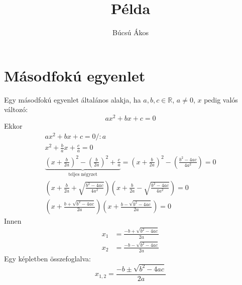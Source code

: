 \documentclass{article}%
\title{Példa}
\author{Búcsú Ákos}
\date{}
\begin{document}
	\maketitle%

	\section{Másodfokú egyenlet}
	Egy másodfokú egyenlet általános alakja, ha $a,b,c\in\mathbb{R}$, $a\neq 0$, $x$ pedig valós változó:
	\begin{equation}
		ax^2+bx+c=0
	\end{equation}
	Ekkor
	\begin{gather}
		ax^2+bx+c=0\Big/:a\\
		x^2+\frac{b}{a}x+\frac{c}{a}=0\\
		\underbrace{\left(x+\frac{b}{2a}\right)^2-
		\left(\frac{b}{2a}\right)^2+\frac{c}{a}}_{\text{teljes négyzet}}=
		\left(x+\frac{b}{2a}\right)^2-
		\left(\frac{b^2-4ac}{4a^2}\right)=0\\
		\left(x+\frac{b}{2a}+\sqrt{\frac{b^2-4ac}{4a^2}}\right)
		\left(x+\frac{b}{2a}-\sqrt{\frac{b^2-4ac}{4a^2}}\right)=0\\
		\left(x+\frac{b+\sqrt{b^2-4ac}}{2a}\right)
		\left(x+\frac{b-\sqrt{b^2-4ac}}{2a}\right)=0
	\end{gather}
	Innen
	\begin{align*}%
		x_1&=\frac{-b+\sqrt{b^2-4ac}}{2a}\\
		x_2&=\frac{-b-\sqrt{b^2-4ac}}{2a}
	\end{align*}
	Egy képletben összefoglalva:
	\begin{equation*}%
		x_{1,2}=\frac{-b\pm\sqrt{b^2-4ac}}{2a}
	\end{equation*}
\end{document}
